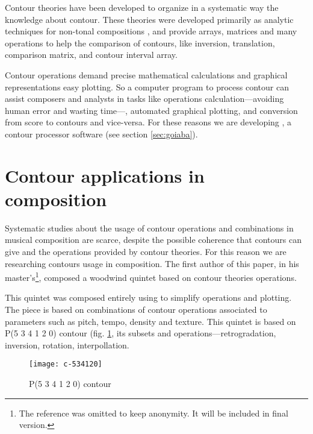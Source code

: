 Contour theories
\cite{friedmann85:methodology,friedmann87:response,morris87:composition,morris93:directions,marvin.ea87:relating,marvin88:generalized,marvin.ea95:generalization,polansky.ea92:possible,quinn97:fuzzy,clifford95:contour,beard03:contour}
have been developed to organize in a systematic way the knowledge
about contour. These theories were developed primarily as analytic
techniques for non-tonal compositions \cite{beard03:contour}, and
provide arrays, matrices and many operations to help the comparison of
contours, like inversion, translation, comparison matrix, and contour
interval array.

Contour operations demand precise mathematical calculations and
graphical representations easy plotting. So a computer program to
process contour can assist composers and analysts in tasks like
operations calculation---avoiding human error and wasting time---,
automated graphical plotting, and conversion from score to contours
and vice-versa. For these reasons we are developing \goiaba{}, a
contour processor software (see section \ref{sec:goiaba}).

\section{Contour applications in composition}
\label{sec:cont-appl-comp}

Systematic studies about the usage of contour operations and
combinations in musical composition are scarce, despite the possible
coherence that contours can give and the operations provided by
contour theories. For this reason we are researching contours usage in
composition. The first author of this paper, in his
master's\footnote{The reference was omitted to keep anonymity. It will
  be included in final version.}, composed a woodwind quintet based on
contour theories operations.

This quintet was composed entirely using \goiaba{} to simplify
operations and plotting. The piece is based on combinations of contour
operations associated to parameters such as pitch, tempo, density and
texture. This quintet is based on P(5 3 4 1 2 0) contour
(fig. \ref{fig:c-534120}, its subsets and operations---retrogradation,
inversion, rotation, interpollation.

\begin{figure}
  \centering
  \texttt{[image: c-534120]}
  \caption{P(5 3 4 1 2 0) contour}
  \label{fig:c-534120}
\end{figure}

